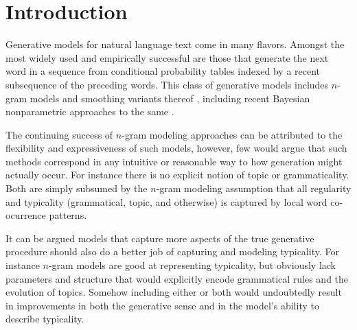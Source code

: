 \section{Introduction}


Generative models for natural language text come in many flavors.  Amongst the most widely used and empirically successful are those that  generate the next word in a sequence from conditional probability tables indexed by a recent subsequence of the preceding words.  This class of generative models includes $n$-gram models  and smoothing variants thereof \cite{Kneser1995,MacKay1995a,Chen1998}, including recent Bayesian nonparametric approaches to the same \cite{Teh2006a,Wood2009}.  

The continuing success of $n$-gram modeling approaches can be attributed to the flexibility and expressiveness of such models, however, few would argue that such methods correspond in any intuitive or reasonable way to how generation might actually occur.   For instance there is no explicit notion of topic or grammaticality.  Both are simply subsumed by the $n$-gram modeling assumption that all regularity and typicality (grammatical, topic, and otherwise) is captured by local word co-ocurrence patterns.

It can be argued models that capture more aspects of the true generative procedure should also do a better job of capturing and modeling typicality.  For instance $n$-gram models are good at representing typicality, but obviously lack parameters and structure that would explicitly encode grammatical rules and the evolution of topics.  
Somehow including either or both would undoubtedly result in improvements in both the generative sense and in the model's ability to describe typicality.

